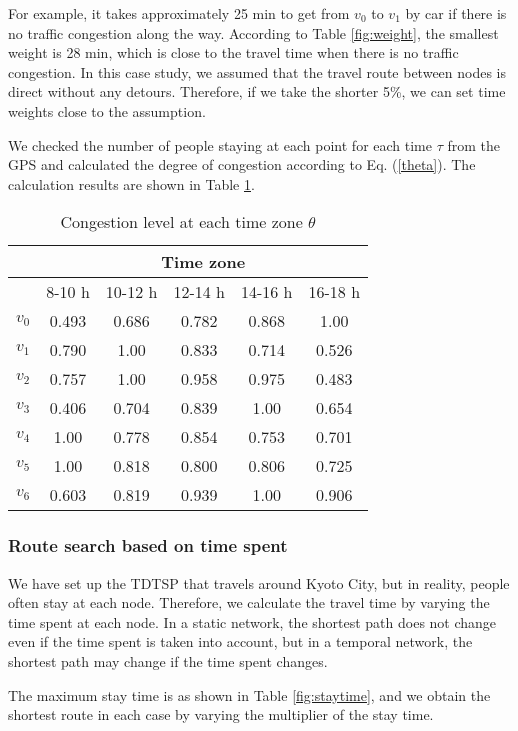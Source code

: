 \documentclass[conference]{IEEEtran}
\begin{document}
For example, it takes approximately 25 min to get from $v_0$ to $v_1$ by car if there is no traffic congestion along the way.
According to Table \ref{fig:weight}, the smallest weight is 28 min, which is close to the travel time when there is no traffic congestion.
In this case study, we assumed that the travel route between nodes is direct without any detours.
Therefore, if we take the shorter 5\%, we can set time weights close to the assumption.

\par We checked the number of people staying at each point for each time $\tau$ from the GPS and calculated the degree of congestion according to Eq. (\ref{theta}).
The calculation results are shown in Table \ref{fig:congestion}.

\begin{table}[h]
 \begin{center}
   \caption{Congestion level at each time zone $\theta$}
   \begin{tabular}{|c||c|c|c|c|c|} \hline
   & \multicolumn{5}{|c|}{Time zone}\\ \hline
   &8-10 h&10-12 h&12-14 h&14-16 h&16-18 h \\ \hline
   $v_0$ &0.493&0.686&0.782&0.868&1.00 \\ \cline{1-6}
   $v_1$ &0.790&1.00&0.833&0.714&0.526\\ \cline{1-6}
   $v_2$ &0.757&1.00&0.958&0.975&0.483 \\ \cline{1-6}
   $v_3$ &0.406&0.704&0.839&1.00&0.654 \\ \cline{1-6}
   $v_4$ &1.00&0.778&0.854&0.753&0.701 \\ \cline{1-6}
   $v_5$ &1.00&0.818&0.800&0.806&0.725\\ \cline{1-6}
   $v_6$ &0.603&0.819&0.939&1.00&0.906\\ \hline
  \end{tabular}
  \label{fig:congestion}
 \end{center}
\end{table}

\subsubsection{Route search based on time spent}
\par We have set up the TDTSP that travels around Kyoto City, but in reality, people often stay at each node.
Therefore, we calculate the travel time by varying the time spent at each node.
In a static network, the shortest path does not change even if the time spent is taken into account, but in a temporal network, the shortest path may change if the time spent changes.
\par The maximum stay time is as shown in Table \ref{fig:staytime}, and we obtain the shortest route in each case by varying the multiplier of the stay time.
\end{document}
